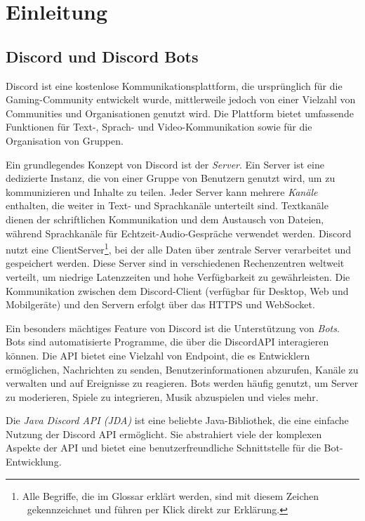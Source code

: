 
\section{Einleitung}\label{einleitung}

\subsection{Discord und Discord Bots}\label{discord-und-discord-bots}
Discord ist eine kostenlose Kommunikationsplattform, die ursprünglich für die Gaming-Com\-mu\-ni\-ty entwickelt wurde, mittlerweile jedoch von einer Vielzahl von Communities und Organisationen genutzt wird. Die Plattform bietet umfassende Funktionen für Text-, Sprach- und Video-Kommunikation sowie für die Organisation von Gruppen.

Ein grundlegendes Konzept von Discord ist der \emph{Server}. Ein Server ist eine dedizierte Instanz, die von einer Gruppe von Benutzern genutzt wird, um zu kommunizieren und Inhalte zu teilen. Jeder Server kann mehrere \emph{Kanäle} enthalten, die weiter in Text- und Sprachkanäle unterteilt sind. Textkanäle dienen der schriftlichen Kommunikation und dem Austausch von Dateien, während Sprachkanäle für Echtzeit-Audio-Gespräche verwendet werden.\autocite{discord-guide} Discord nutzt eine \gls{ClientServer}\footnote{Alle Begriffe, die im Glossar erklärt werden, sind mit diesem Zeichen \large\adfrightarrowhead\footnotesize\ gekennzeichnet und führen per Klick direkt zur Erklärung.}, bei der alle Daten über zentrale Server verarbeitet und gespeichert werden. Diese Server sind in verschiedenen Rechenzentren weltweit verteilt, um niedrige Latenzzeiten und hohe Verfügbarkeit zu gewährleisten. Die Kommunikation zwischen dem Discord-Client (verfügbar für Desktop, Web und Mobilgeräte) und den Servern erfolgt über das \gls{HTTPS} und \gls{WebSocket}.\autocite{discord-developer}

Ein besonders mächtiges Feature von Discord ist die Unterstützung von \emph{Bots}. Bots sind automatisierte Programme, die über die \gls{DiscordAPI} interagieren können. Die API bietet eine Vielzahl von \gls{Endpoint}, die es Entwicklern ermöglichen, Nachrichten zu senden, Benutzerinformationen abzurufen, Kanäle zu verwalten und auf Ereignisse zu reagieren. Bots werden häufig genutzt, um Server zu moderieren, Spiele zu integrieren, Musik abzuspielen und vieles mehr.

Die \emph{Java Discord API (JDA)} ist eine beliebte Java-Bibliothek, die eine einfache Nutzung der Discord API ermöglicht. Sie abstrahiert viele der komplexen Aspekte der API und bietet eine benutzerfreundliche Schnittstelle für die Bot-Entwicklung.

